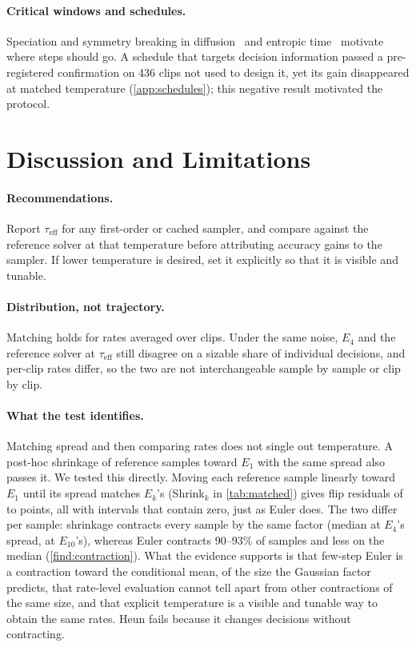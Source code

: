 \documentclass{article}
\theoremstyle{plain}
\theoremstyle{definition}
\theoremstyle{remark}
\newcommand{\taueff}{\tau_{\mathrm{eff}}}
\begin{document}
\paragraph{Critical windows and schedules.} Speciation and symmetry breaking in diffusion~\citep{biroli2024dynamical,raya2023ssb} and entropic time~\citep{stancevic2025entropic} motivate where steps should go. A schedule that targets decision information passed a pre-registered confirmation on 436 clips not used to design it, yet its gain disappeared at matched temperature (\cref{app:schedules}); this negative result motivated the protocol.

\section{Discussion and Limitations}
\label{sec:discussion}
\paragraph{Recommendations.} Report $\taueff$ for any first-order or cached sampler, and compare against the reference solver at that temperature before attributing accuracy gains to the sampler. If lower temperature is desired, set it explicitly so that it is visible and tunable.
\paragraph{Distribution, not trajectory.} Matching holds for rates averaged over clips. Under the same noise, $E_4$ and the reference solver at $\taueff$ still disagree on a sizable share of individual decisions, and per-clip rates differ, so the two are not interchangeable sample by sample or clip by clip.
\paragraph{What the test identifies.} Matching spread and then comparing rates does not single out temperature. A post-hoc shrinkage of reference samples toward $E_1$ with the same spread also passes it. We tested this directly. Moving each reference sample linearly toward $E_1$ until its spread matches $E_k$'s (Shrink$_k$ in \cref{tab:matched}) gives flip residuals of \ShrinkFlipResidMin{} to \ShrinkFlipResidMax{} points, all with intervals that contain zero, just as Euler does. The two differ per sample: shrinkage contracts every sample by the same factor (median \ShrinkContrFour{} at $E_4$'s spread, \ShrinkContrTen{} at $E_{10}$'s), whereas Euler contracts 90--93\% of samples and less on the median (\cref{find:contraction}). What the evidence supports is that few-step Euler is a contraction toward the conditional mean, of the size the Gaussian factor predicts, that rate-level evaluation cannot tell apart from other contractions of the same size, and that explicit temperature is a visible and tunable way to obtain the same rates. Heun fails because it changes decisions without contracting.
\end{document}
